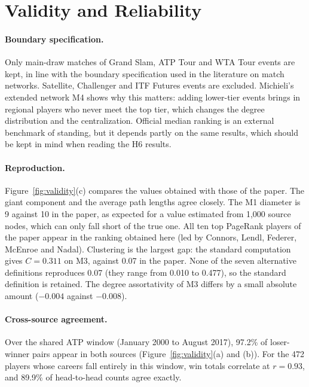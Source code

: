 \documentclass[12pt, a4paper]{article}
\begin{document}
\section{Validity and Reliability}
\label{validity-and-reliability}

\paragraph{Boundary specification.} Only main-draw matches of Grand Slam, ATP Tour and WTA Tour events are kept, in line with the boundary specification used in the literature on match networks. Satellite, Challenger and ITF Futures events are excluded. Michieli's extended network M4 shows why this matters: adding lower-tier events brings in regional players who never meet the top tier, which changes the degree distribution and the centralization. Official median ranking is an external benchmark of standing, but it depends partly on the same results, which should be kept in mind when reading the H6 results.

\paragraph{Reproduction.} Figure~\ref{fig:validity}(c) compares the values obtained with those of the paper. The giant component and the average path lengths agree closely. The M1 diameter is 9 against 10 in the paper, as expected for a value estimated from 1,000 source nodes, which can only fall short of the true one. All ten top PageRank players of the paper appear in the ranking obtained here (led by Connors, Lendl, Federer, McEnroe and Nadal). Clustering is the largest gap: the standard computation gives $C = 0.311$ on M3, against 0.07 in the paper. None of the seven alternative definitions reproduces 0.07 (they range from 0.010 to 0.477), so the standard definition is retained. The degree assortativity of M3 differs by a small absolute amount ($-0.004$ against $-0.008$).

\paragraph{Cross-source agreement.} Over the shared ATP window (January 2000 to August 2017), 97.2\% of loser-winner pairs appear in both sources (Figure~\ref{fig:validity}(a) and (b)). For the 472 players whose careers fall entirely in this window, win totals correlate at $r = 0.93$, and 89.9\% of head-to-head counts agree exactly.
\end{document}
